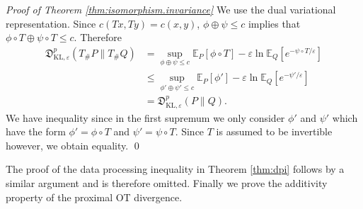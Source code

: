 \documentclass{amsart}
\theoremstyle{definition}
\theoremstyle{remark}
\numberwithin{equation}{section}
\begin{document}
\noindent
{\it Proof of Theorem \ref{thm:isomorphism.invariance}}  
We use the dual variational representation.  Since $c(Tx,Ty)=c(x,y)$, $\phi \oplus \psi \le c$ implies that $\phi \circ T \oplus \psi \circ T \le c$. Therefore 
\begin{equation}
\begin{aligned}
 \mathfrak{D}^{p}_{\textrm{KL},\varepsilon}( T_\# P\| T_\# Q) &= \sup_{\phi \oplus \psi \le c} \mathbb{E}_P[\phi \circ T] - \varepsilon \ln \mathbb{E}_Q[e^{-\psi\circ T/\varepsilon}] \\
 &\le \sup_{\phi'  \oplus \psi' \le c} \mathbb{E}_P[\phi' ] - \varepsilon \ln \mathbb{E}_Q[e^{-\psi'/\varepsilon}]\\
 & = \mathfrak{D}^{p}_{\textrm{KL},\varepsilon}(  P\| Q).
\end{aligned}
\end{equation}
We have inequality since in the first supremum we only consider $\phi'$ and $\psi'$ which have the form $\phi'=\phi \circ T$ and $\psi'=\psi\circ T$. Since $T$ is 
assumed to be invertible however, we obtain equality.
\qed

The proof of the data processing inequality in Theorem \ref{thm:dpi} follows by a similar argument and is therefore omitted. Finally we prove the additivity  
property of the proximal OT divergence. 
\medskip
\end{document}
